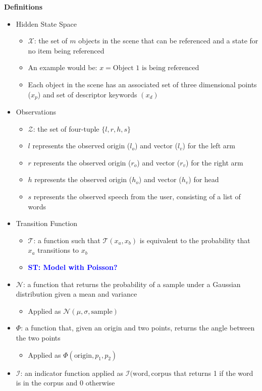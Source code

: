 \documentclass[letterpaper, 10 pt, conference]{ieeeconf}
\newcommand{\stnote}[1]{\textcolor{Blue}{\textbf{ST: #1}}}
\begin{document}
\textbf{Definitions}
\begin{itemize}
\item{Hidden State Space}
	\begin{itemize}
	\item{$\mathcal{X}$: the set of $m$ objects in the scene that can be referenced and a state for no item being referenced}
	\item{An example would be: $x = \text{Object 1 is being referenced}$}
	\item{Each object in the scene has an associated set of three dimensional points ($x_p$) and set of descriptor keywords $(x_d)$}
	\end{itemize}
\item{Observations}
	\begin{itemize}
	\item{$\mathcal{Z}$: the set of four-tuple $\{l, r, h, s\}$}
	\item{$l$ represents the observed origin ($l_o$) and vector ($l_v$) for the left arm}
	\item{$r$ represents the observed origin  ($r_o$) and vector ($r_v$)  for the right arm}
	\item{$h$ represents the observed origin  ($h_o$) and vector ($h_v$)  for head}
	\item{$s$ represents the observed speech from the user, consisting of a list of words}
	\end{itemize}
\item{Transition Function}
	\begin{itemize}
	\item{$\mathcal{T}$: a function such that $\mathcal{T}(x_a, x_b)$ is equivalent to the probability that $x_a$ transitions to $x_b$}
	\item{\stnote{Model with Poisson?}}
	\end{itemize}
\item{$\mathcal{N}$: a function that returns the probability of a sample under a Gaussian distribution given a mean and variance}
	\begin{itemize}
	\item{Applied as $\mathcal{N}(\mu, \sigma, \text{sample})$}
	\end{itemize}
\item{$\Phi$: a function that, given an origin and two points, returns the angle between the two points}
	\begin{itemize}
	\item{Applied as $\Phi(\text{origin}, p_1, p_2)$}
	\end{itemize}
\item{$\mathcal{I}$: an indicator function applied as $\mathcal{I}(\text{word}, \text{corpus}$ that returns 1 if the word is in the corpus and 0 otherwise}
\end{itemize}
\end{document}
